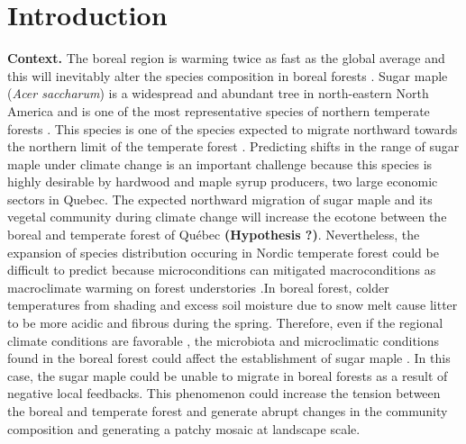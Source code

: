 


\newpage
\setcounter{page}{1}

\section{Introduction}

\textbf{Context.}  The boreal region is warming twice as fast as the global
average and  this will inevitably alter the species composition in boreal
forests \cite{Scheffer2012,Hughes2000}. Sugar maple (\textit{Acer saccharum})
is a widespread and abundant tree in north-eastern North America and is one of
the most representative species of northern temperate forests
\cite{Graignic2013,Messaoud2007,Kellman2004,Barras1998}. This species is one
of the species expected to migrate northward towards the northern limit of the
temperate forest \cite{McKENNEY2007,Goldblum2005}. Predicting shifts in the
range of sugar maple under climate change is an important challenge because
this species is highly desirable by hardwood and maple syrup producers, two
large economic sectors in Quebec. The expected northward migration of sugar
maple and its vegetal community during climate change will increase the
ecotone between the boreal and temperate forest of Québec \textbf{(Hypothesis
?)}. Nevertheless, the expansion of species distribution occuring in Nordic
temperate forest could be difficult to predict because microconditions can
mitigated macroconditions as macroclimate warming on forest understories
\cite{DeFrenne2013}.In boreal forest, colder temperatures from shading and
excess soil moisture due to snow melt cause litter to be more acidic and
fibrous during the spring. Therefore, even if the regional climate conditions
are favorable \cite{Kellman2004}, the microbiota and microclimatic conditions
found in the boreal forest could affect the establishment of sugar maple
\cite{Kellman2004,Moore2008,DeFrenne2013,Barras1998}. In this case, the sugar
maple could be unable to migrate in boreal forests as a result of negative
local feedbacks. This phenomenon could increase the tension between the boreal
and temperate forest and generate abrupt changes in the community composition
and generating a patchy mosaic at landscape scale.\\

